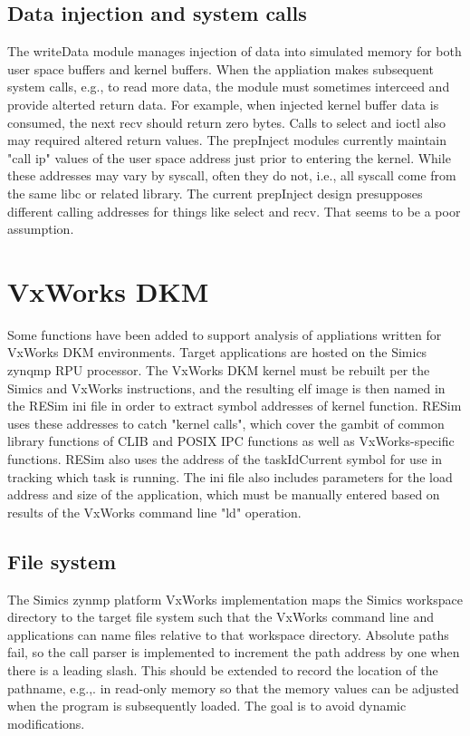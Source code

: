 \documentclass[titlepage]{article}
\begin{document}
\begin{appendices}
\subsection{Data injection and system calls}
The writeData module manages injection of data into simulated memory for both user space buffers and kernel buffers.  When the appliation makes subsequent system calls,
e.g., to read more data, the module must sometimes interceed and provide alterted return data. For example, when injected kernel buffer data is consumed, the next
recv should return zero bytes.  Calls to select and ioctl also may required altered return values.  The prepInject modules currently maintain "call ip" values of
the user space address just prior to entering the kernel.  While these addresses may vary by syscall, often they do not, i.e., all syscall come from the same libc
or related library.  The current prepInject design presupposes different calling addresses for things like select and recv.  That seems to be a poor assumption.  

\section{VxWorks DKM}
\label{vxworks}
Some functions have been added to support analysis of appliations written for VxWorks DKM environments.  Target applications are hosted on 
the Simics zynqmp RPU processor.  The VxWorks DKM kernel must be rebuilt per the Simics and VxWorks instructions, and the resulting elf image is then
named in the RESim ini file in order to extract symbol addresses of kernel function. RESim uses these addresses to catch "kernel calls", which cover the gambit of common library
functions of CLIB and POSIX IPC functions as well as VxWorks-specific functions. RESim also uses the address of the taskIdCurrent symbol for use in tracking
which task is running.  The ini file also includes parameters for the load address and size of the application, which must be manually entered based on results of the
VxWorks command line "ld" operation.   

\subsection {File system}
The Simics zynmp platform VxWorks implementation maps the Simics workspace directory to the target file system such that the VxWorks command line and applications can name files 
relative to that workspace directory.  Absolute paths fail, so the call parser is implemented to increment the path address by one when there is a leading slash.  This should
be extended to record the location of the pathname, e.g.,. in read-only memory so that the memory values can be adjusted when the program is subsequently loaded.  The goal is
to avoid dynamic modifications.


\end{appendices}
\end{document}
